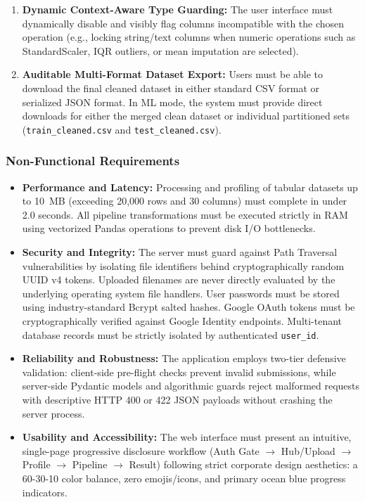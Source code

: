 \begin{enumerate}[label=\textbf{FR\arabic*.}]
  \item \textbf{Dynamic Context-Aware Type Guarding:} The user interface must dynamically disable and visibly flag columns incompatible with the chosen operation (e.g., locking string/text columns when numeric operations such as StandardScaler, IQR outliers, or mean imputation are selected).
  \item \textbf{Auditable Multi-Format Dataset Export:} Users must be able to download the final cleaned dataset in either standard CSV format or serialized JSON format. In ML mode, the system must provide direct downloads for either the merged clean dataset or individual partitioned sets (\texttt{train\_cleaned.csv} and \texttt{test\_cleaned.csv}).
\end{enumerate}

\subsubsection{Non-Functional Requirements}
\begin{itemize}
  \item \textbf{Performance and Latency:} Processing and profiling of tabular datasets up to 10~MB (exceeding 20,000 rows and 30 columns) must complete in under 2.0 seconds. All pipeline transformations must be executed strictly in RAM using vectorized Pandas operations to prevent disk I/O bottlenecks.
  \item \textbf{Security and Integrity:} The server must guard against Path Traversal vulnerabilities by isolating file identifiers behind cryptographically random UUID v4 tokens. Uploaded filenames are never directly evaluated by the underlying operating system file handlers. User passwords must be stored using industry-standard Bcrypt salted hashes. Google OAuth tokens must be cryptographically verified against Google Identity endpoints. Multi-tenant database records must be strictly isolated by authenticated \texttt{user\_id}.
  \item \textbf{Reliability and Robustness:} The application employs two-tier defensive validation: client-side pre-flight checks prevent invalid submissions, while server-side Pydantic models and algorithmic guards reject malformed requests with descriptive HTTP 400 or 422 JSON payloads without crashing the server process.
  \item \textbf{Usability and Accessibility:} The web interface must present an intuitive, single-page progressive disclosure workflow (Auth Gate $\rightarrow$ Hub/Upload $\rightarrow$ Profile $\rightarrow$ Pipeline $\rightarrow$ Result) following strict corporate design aesthetics: a 60-30-10 color balance, zero emojis/icons, and primary ocean blue progress indicators.
\end{itemize}

